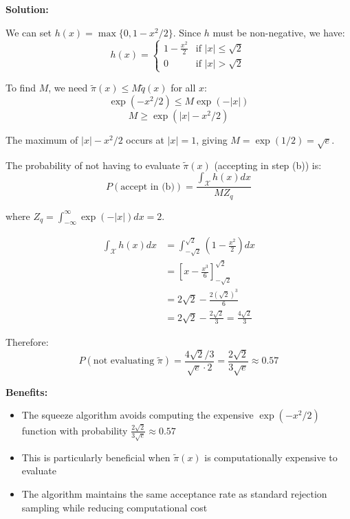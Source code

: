 \textbf{Solution:}

We can set $h(x) = \max\{0, 1 - x^2/2\}$. Since $h$ must be non-negative, we have:
\[h(x) = \begin{cases}
1 - \frac{x^2}{2} & \text{if } |x| \leq \sqrt{2}\\
0 & \text{if } |x| > \sqrt{2}
\end{cases}\]

To find $M$, we need $\tilde{\pi}(x) \leq M\tilde{q}(x)$ for all $x$:
\[\exp(-x^2/2) \leq M\exp(-|x|)\]
\[M \geq \exp(|x| - x^2/2)\]

The maximum of $|x| - x^2/2$ occurs at $|x| = 1$, giving $M = \exp(1/2) = \sqrt{e}$.

The probability of not having to evaluate $\tilde{\pi}(x)$ (accepting in step (b)) is:
\[P(\text{accept in (b)}) = \frac{\int_\mathcal{X} h(x)dx}{MZ_q}\]

where $Z_q = \int_{-\infty}^{\infty} \exp(-|x|)dx = 2$.

\begin{align*}
\int_\mathcal{X} h(x)dx &= \int_{-\sqrt{2}}^{\sqrt{2}} \left(1 - \frac{x^2}{2}\right)dx\\
&= \left[x - \frac{x^3}{6}\right]_{-\sqrt{2}}^{\sqrt{2}}\\
&= 2\sqrt{2} - \frac{2(\sqrt{2})^3}{6}\\
&= 2\sqrt{2} - \frac{2\sqrt{2}}{3} = \frac{4\sqrt{2}}{3}
\end{align*}

Therefore:
\[P(\text{not evaluating } \tilde{\pi}) = \frac{4\sqrt{2}/3}{\sqrt{e} \cdot 2} = \frac{2\sqrt{2}}{3\sqrt{e}} \approx 0.57\]

\textbf{Benefits:}
\begin{itemize}
\item The squeeze algorithm avoids computing the expensive $\exp(-x^2/2)$ function with probability $\frac{2\sqrt{2}}{3\sqrt{e}} \approx 0.57$
\item This is particularly beneficial when $\tilde{\pi}(x)$ is computationally expensive to evaluate
\item The algorithm maintains the same acceptance rate as standard rejection sampling while reducing computational cost
\end{itemize}

